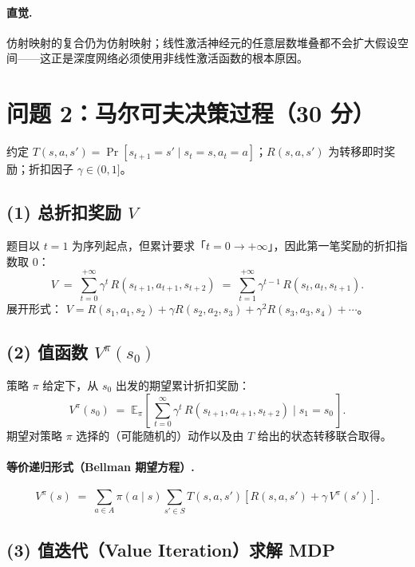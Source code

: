 \documentclass[12pt]{article}
\newcommand{\E}{\mathbb{E}}
\begin{document}
\paragraph{直觉.}
仿射映射的复合仍为仿射映射；线性激活神经元的任意层数堆叠都不会扩大假设空间——这正是深度网络必须使用非线性激活函数的根本原因。

\newpage
\section*{问题 2：马尔可夫决策过程（30 分）}

约定 $T(s,a,s')=\Pr[s_{t+1}=s'\mid s_t=s,a_t=a]$；$R(s,a,s')$ 为转移即时奖励；折扣因子 $\gamma\in(0,1]$。

\subsection*{(1) 总折扣奖励 $V$}

题目以 $t=1$ 为序列起点，但累计要求「$t=0\to+\infty$」，因此第一笔奖励的折扣指数取 $0$：
\[
\boxed{\;
V \;=\; \sum_{t=0}^{+\infty}\gamma^{t}\,R(s_{t+1},a_{t+1},s_{t+2})
   \;=\; \sum_{t=1}^{+\infty}\gamma^{t-1}\,R(s_{t},a_{t},s_{t+1}).
\;}
\]
展开形式：
$V=R(s_1,a_1,s_2)+\gamma R(s_2,a_2,s_3)+\gamma^{2} R(s_3,a_3,s_4)+\cdots$。

\subsection*{(2) 值函数 $V^{\pi}(s_0)$}

策略 $\pi$ 给定下，从 $s_0$ 出发的期望累计折扣奖励：
\[
\boxed{\;
V^{\pi}(s_0)
\;=\; \E_{\pi}\!\left[\,
\sum_{t=0}^{\infty}\gamma^{t}\,R(s_{t+1},a_{t+1},s_{t+2})\;\Big|\;s_1=s_0
\,\right].
\;}
\]
期望对策略 $\pi$ 选择的（可能随机的）动作以及由 $T$ 给出的状态转移联合取得。

\paragraph{等价递归形式（Bellman 期望方程）.}
\[
V^{\pi}(s)\;=\;\sum_{a\in A}\pi(a\mid s)\sum_{s'\in S} T(s,a,s')\!\left[R(s,a,s')+\gamma\,V^{\pi}(s')\right].
\]

\subsection*{(3) 值迭代（Value Iteration）求解 MDP}
\end{document}
